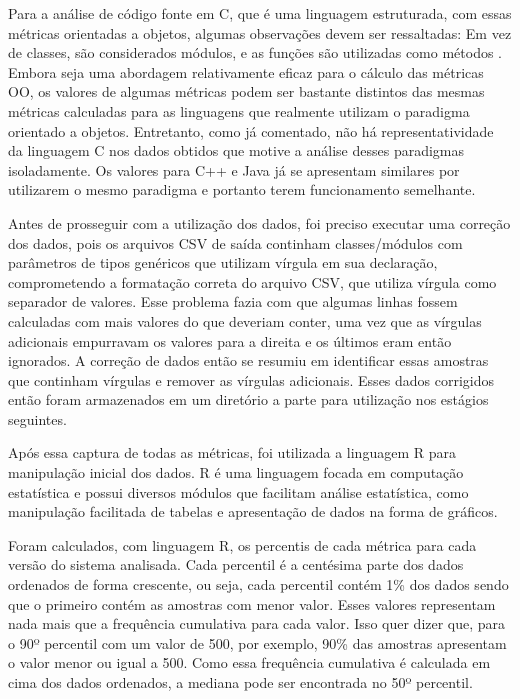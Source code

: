Para a análise de código fonte em C, que é uma linguagem estruturada, com essas métricas orientadas a objetos, algumas observações devem ser ressaltadas: Em vez de classes, são considerados módulos, e as funções são utilizadas como métodos \cite{terceiro2009}. Embora seja uma abordagem relativamente eficaz para o cálculo das métricas OO, os valores de algumas métricas podem ser bastante distintos das mesmas métricas calculadas para as linguagens que realmente utilizam o paradigma orientado a objetos. Entretanto, como já comentado, não há representatividade da linguagem C nos dados obtidos que motive a análise desses paradigmas isoladamente. Os valores para C++ e Java já se apresentam similares por utilizarem o mesmo paradigma e portanto terem funcionamento semelhante.

Antes de prosseguir com a utilização dos dados, foi preciso executar uma correção dos dados, pois os arquivos CSV de saída continham classes/módulos com parâmetros de tipos genéricos que utilizam vírgula em sua declaração, comprometendo a formatação correta do arquivo CSV, que utiliza vírgula como separador de valores. Esse problema fazia com que algumas linhas fossem calculadas com mais valores do que deveriam conter, uma vez que as vírgulas adicionais empurravam os valores para a direita e os últimos eram então ignorados. A correção de dados então se resumiu em identificar essas amostras que continham vírgulas e remover as vírgulas adicionais. Esses dados corrigidos então foram armazenados em um diretório a parte para utilização nos estágios seguintes.

Após essa captura de todas as métricas, foi utilizada a linguagem R para manipulação inicial dos dados. R é uma linguagem focada em computação estatística e possui diversos módulos que facilitam análise estatística, como manipulação facilitada de tabelas e apresentação de dados na forma de gráficos.

Foram calculados, com linguagem R, os percentis de cada métrica para cada versão do sistema analisada. Cada percentil é a centésima parte dos dados ordenados de forma crescente, ou seja, cada percentil contém 1\% dos dados sendo que o primeiro contém as amostras com menor valor. Esses valores representam nada mais que a frequência cumulativa para cada valor. Isso quer dizer que, para o 90º percentil com um valor de 500, por exemplo, 90\% das amostras apresentam o valor menor ou igual a 500. Como essa frequência cumulativa é calculada em cima dos dados ordenados, a mediana pode ser encontrada no 50º percentil.

